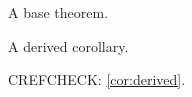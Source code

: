 \documentclass[11pt]{article}
\begin{document}
\begin{theorem}\label{thm:base}
  A base theorem.
\end{theorem}

\begin{corollary}\label{cor:derived}
  A derived corollary.
\end{corollary}

CREFCHECK: \cref{cor:derived}.
\end{document}
